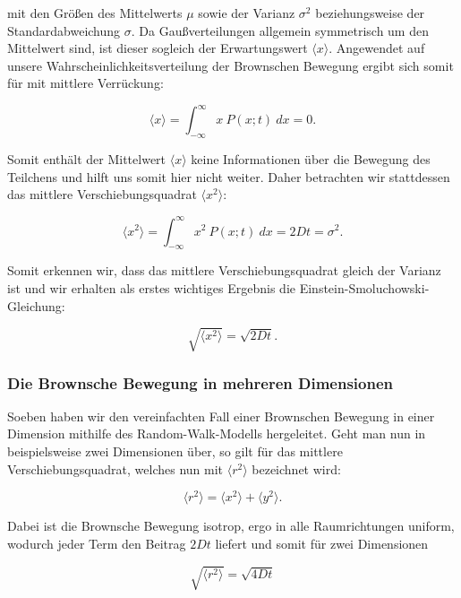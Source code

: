 \documentclass{article}
\begin{document}
mit den Größen des Mittelwerts $\mu$ sowie der Varianz $\sigma^2$ beziehungsweise der Standardabweichung $\sigma$. Da Gaußverteilungen allgemein symmetrisch um den Mittelwert sind, ist dieser sogleich der Erwartungswert $\langle x \rangle$. Angewendet auf unsere Wahrscheinlichkeitsverteilung der Brownschen Bewegung ergibt sich somit für mit mittlere Verrückung:

\begin{equation}
    \langle x \rangle = \int_{-\infty}^\infty x \ P(x;t) \ dx = 0.
\end{equation}

Somit enthält der Mittelwert $\langle x \rangle$ keine Informationen über die Bewegung des Teilchens und hilft uns somit hier nicht weiter. Daher betrachten wir stattdessen das mittlere Verschiebungsquadrat $\langle x^2 \rangle$:

\begin{equation}
    \langle x^2 \rangle = \int_{-\infty}^\infty x^2 \ P(x;t) \ dx = 2Dt = \sigma^2.
\end{equation}

Somit erkennen wir, dass das mittlere Verschiebungsquadrat gleich der Varianz ist und wir erhalten als erstes wichtiges Ergebnis die Einstein-Smoluchowski-Gleichung:

\begin{equation}
    \sqrt{\langle x^2 \rangle} = \sqrt{2Dt}.
\end{equation}

\subsubsection{Die Brownsche Bewegung in mehreren Dimensionen}

Soeben haben wir den vereinfachten Fall einer Brownschen Bewegung in einer Dimension mithilfe des Random-Walk-Modells hergeleitet. Geht man nun in beispielsweise zwei Dimensionen über, so gilt für das mittlere Verschiebungsquadrat, welches nun mit $\langle r^2 \rangle$ bezeichnet wird:

\begin{equation}
    \langle r^2 \rangle = \langle x^2 \rangle + \langle y^2 \rangle.
\end{equation}

Dabei ist die Brownsche Bewegung isotrop, ergo in alle Raumrichtungen uniform, wodurch jeder Term den Beitrag $2Dt$ liefert und somit für zwei Dimensionen

\begin{equation}
    \sqrt{\langle r^2 \rangle} = \sqrt{4Dt}
    \label{eq:r^2_2dim}
\end{equation}
\end{document}
